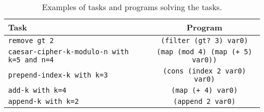 \begin{table}[H]
    \centering
    \begin{tabular}{|p{5cm}|c|}
        \hline
        \textbf{Task} & \textbf{Program} \\\hline
        \texttt{remove gt 2} & \texttt{(filter (gt? 3) var0)} \\\hline
        \texttt{caesar-cipher-k-modulo-n with k=5 and n=4} & \texttt{(map (mod 4) (map (+ 5) var0))} \\\hline
        \texttt{prepend-index-k with k=3} & \texttt{(cons (index 2 var0) var0)} \\\hline
        \texttt{add-k with k=4} & \texttt{(map (+ 4) var0)} \\\hline
        \texttt{append-k with k=2} & \texttt{(append 2 var0)} \\\hline
    \end{tabular}
    \caption{Examples of tasks and programs solving the tasks.}
    \label{tab:task_programs}
\end{table}
